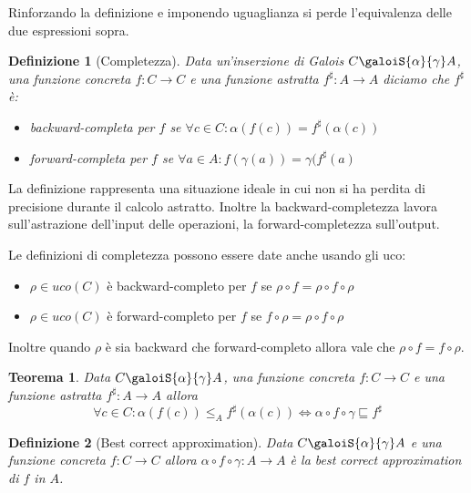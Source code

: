 \documentclass{article}
\newtheorem{definit}{Definizione}[subsection]
\newtheorem{thm}{Teorema}[subsection]
\begin{document}
            Rinforzando la definizione e imponendo uguaglianza si perde l'equivalenza delle due espressioni sopra. 
            \begin{definit}[Completezza]
                Data un'inserzione di Galois $C \galoiS{\alpha}{\gamma} A$, una funzione concreta $f: C \to C$ e una funzione astratta $f^\sharp: A \to A$ diciamo che $f^\sharp$ è: \begin{itemize}
                    \item backward-completa per $f$ se  $\forall c \in C: \alpha(f(c)) = f^\sharp(\alpha(c))$
                    \item forward-completa per $f$ se $\forall a \in A: f(\gamma(a)) = \gamma(f^\sharp(a)$
                \end{itemize}
            \end{definit}
            
            La definizione rappresenta una situazione ideale in cui non si ha perdita di precisione durante il calcolo astratto. Inoltre la backward-completezza lavora sull'astrazione dell'input delle operazioni, la forward-completezza sull'output.
            
            Le definizioni di completezza possono essere date anche usando gli uco: \begin{itemize}
                \item $\rho \in uco(C)$ è backward-completo per $f$ se $\rho \circ f = \rho \circ f \circ \rho$
                \item $\rho \in uco(C)$ è forward-completo per $f$ se $f \circ \rho = \rho \circ f \circ \rho$
            \end{itemize}

            Inoltre quando $\rho$ è sia backward che forward-completo allora vale che $\rho \circ f = f \circ \rho$.
            
            \begin{thm}
                Data $C \galoiS{\alpha}{\gamma} A$, una funzione concreta $f : C \to C$  e una funzione astratta $f^\sharp: A \to A$ allora  \[ \forall c \in C: \alpha(f(c)) \leq_A f^\sharp(\alpha(c)) \Leftrightarrow \alpha \circ f \circ \gamma \sqsubseteq f^\sharp \]
            \end{thm}

            \begin{definit}[Best correct approximation]
                Data $C \galoiS{\alpha}{\gamma} A$ e una funzione concreta $f : C \to C$ allora $\alpha \circ f \circ \gamma : A \to A$ è la best correct approximation di $f$ in $A$.
            \end{definit}
        
\end{document}
